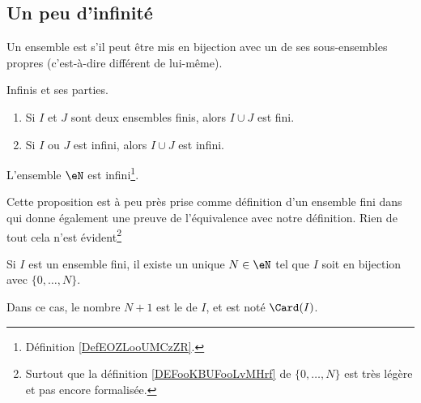 \subsection{Un peu d'infinité}

\begin{definition}      \label{DefEOZLooUMCzZR}
    Un ensemble est  s'il peut être mis en bijection avec un de ses sous-ensembles propres (c'est-à-dire différent de lui-même).
\end{definition}

\begin{lemma}       \label{LEMooYHGCooAwsVQN}
    Infinis et ses parties.
    \begin{enumerate}
        \item
            Si \( I\) et \( J\) sont deux ensembles finis, alors \( I\cup J\) est fini.
        \item
            Si \( I\) ou \( J\) est infini, alors \( I \cup J\) est infini.
    \end{enumerate}
\end{lemma}

\begin{proposition}     \label{PROPooBYKCooGDkfWy}
    L'ensemble \( \eN\) est infini\footnote{Définition \ref{DefEOZLooUMCzZR}.}.
\end{proposition}

Cette proposition est à peu près prise comme définition d'un ensemble fini dans \cite{ooVAYLooJxVYex} qui donne également une preuve de l'équivalence avec notre définition. Rien de tout cela n'est évident\footnote{Surtout que la définition \ref{DEFooKBUFooLvMHrf} de \( \{ 0,\ldots, N \}\) est très légère et pas encore formalisée.}
\begin{propositionDef}     \label{PROPooJLGKooDCcnWi}
    Si \( I\) est un ensemble fini, il existe un unique \( N\in \eN\) tel que \( I\) soit en bijection avec \( \{ 0,\ldots, N \}\).

    Dans ce cas, le nombre \( N+1\) est le  de \( I\), et est noté \( \Card(I)\).
\end{propositionDef}

